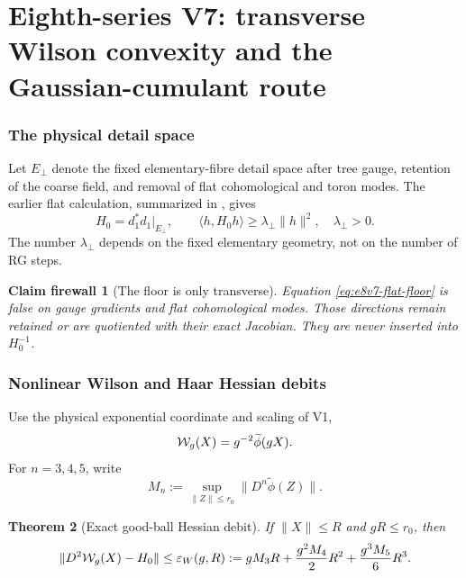 \documentclass[11pt,oneside]{book}
\newtheorem{theorem}{Theorem}[chapter]
\newtheorem{firewall}[theorem]{Claim firewall}
\theoremstyle{definition}
\theoremstyle{remark}
\begin{document}


\part{Eighth-series V7: transverse Wilson convexity and the
Gaussian-cumulant route}
\label{part:e8v7}

\section{The physical detail space}
\label{sec:e8v7-detail}

Let \(E_\perp\) denote the fixed elementary-fibre detail space after
tree gauge, retention of the coarse field, and removal of flat
cohomological and toron modes.  The earlier flat calculation,
summarized in , gives
\[
 H_0=d_1^*d_1\big|_{E_\perp},\qquad
 \langle h,H_0h\rangle\ge\lambda_\perp\|h\|^2,
 \quad\lambda_\perp>0.                              \label{eq:e8v7-flat-floor}
\]
The number \(\lambda_\perp\) depends on the fixed elementary
geometry, not on the number of RG steps.

\begin{firewall}[The floor is only transverse]
\label{fire:e8v7-floor}
Equation \eqref{eq:e8v7-flat-floor} is false on gauge gradients and
flat cohomological modes.  Those directions remain retained or are
quotiented with their exact Jacobian.  They are never inserted into
\(H_0^{-1}\).
\end{firewall}

\section{Nonlinear Wilson and Haar Hessian debits}
\label{sec:e8v7-Hessian}

Use the physical exponential coordinate and scaling of V1,
\[
 {\cal W}_g(X)=g^{-2}\widetilde\phi(gX).
\]
For \(n=3,4,5\), write
\[
 M_n:=\sup_{\|Z\|\le r_0}\|D^n\widetilde\phi(Z)\|.   \label{eq:e8v7-Mn}
\]

\begin{theorem}[Exact good-ball Hessian debit]
\label{thm:e8v7-Hessian-debit}
If \(\|X\|\le R\) and \(gR\le r_0\), then
\[
 \|D^2{\cal W}_g(X)-H_0\|
 \le
 \varepsilon_W(g,R)
 :=gM_3R+\frac{g^2M_4}{2}R^2
       +\frac{g^3M_5}{6}R^3.                        \label{eq:e8v7-W-debit}
\]
\end{theorem}
\end{document}
